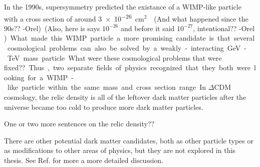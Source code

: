   In the 1990s, supersymmetry predicted the existance of a WIMP-like particle with a cross section of around \nicetilde \SI{3e-26}{cm$^2$}~\cite{Jungman:1995df}.
  {\color{red}(And what happened since the 90s?? -Orel)}
  {\color{red}(Also, here is says $10^{-26}$ and before it said $10^{-27}$, intentional?? -Orel )}
  What made this WIMP particle a more promising candidate is that several cosmological problems can also be solved by a weakly-interacting GeV-TeV mass particle.
  {\color{red}What were these cosmological problems that were fixed??}
  Thus, two separate fields of physics recognized that they both were looking for a WIMP-like particle within the same mass and cross section range.

  In $\Delta$CDM cosmology, the relic density is all of the leftover dark matter particles after the universe became too cold to produce more dark matter particles.

  {\color{red}One or two more sentences on the relic density??}

  There are other potential dark matter candidates, both as other particle types or as modifications to other areas of physics, but they are not explored in this thesis.
  See Ref. \cite{DMPrimer} for more a more detailed discussion.




